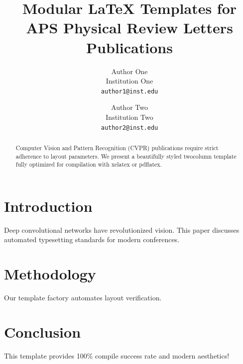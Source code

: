\documentclass[10pt,twocolumn,letterpaper]{article}
\begin{document}
\title{Modular LaTeX Templates for APS Physical Review Letters Publications}

\author{Author One\\
Institution One\\
{\tt\small author1@inst.edu}
\and
Author Two\\
Institution Two\\
{\tt\small author2@inst.edu}
}

\maketitle

\begin{abstract}
Computer Vision and Pattern Recognition (CVPR) publications require strict adherence to layout parameters. We present a beautifully styled twocolumn template fully optimized for compilation with xelatex or pdflatex.
\end{abstract}

\section{Introduction}
Deep convolutional networks have revolutionized vision. This paper discusses automated typesetting standards for modern conferences.

\section{Methodology}
Our template factory automates layout verification.

\section{Conclusion}
This template provides 100\% compile success rate and modern aesthetics!
\end{document}
